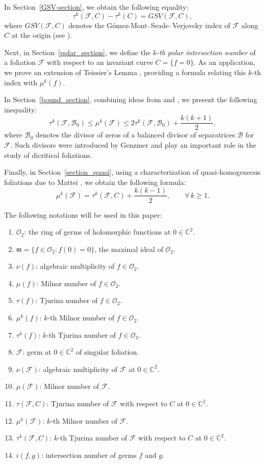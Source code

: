 \documentclass[12pt,letterpaper]{amsart}
\newcommand{\C}{\mathbb{C}}
\newcommand{\F}{\mathcal{F}}
\newcommand{\m}{\mathfrak{m}}
\newcommand{\B}{\mathcal{B}}
\begin{document}
\par In Section~\ref{GSV-section}, we obtain the following equality:
\[
\tau^k(\F,C) - \tau^k(C) = GSV(\F,C),
\]
where $GSV(\F,C)$ denotes the G\'omez-Mont–Seade–Verjovsky index of $\F$ along $C$ at the origin (see \cite{GSV}).  

Next, in Section~\ref{polar_section}, we define the \textit{$k$-th polar intersection number} of a foliation $\F$ with respect to an invariant curve $C = \{f = 0\}$. As an application, we prove an extension of Teissier’s Lemma \cite{Teissier}, providing a formula relating this $k$-th index with $\mu^{k}(f)$.  

\par In Section~\ref{bound_section}, combining ideas from \cite{Liu} and \cite{Hussain_1}, we present the following inequality:
\[
\tau^{k}(\F,\B_0) \leq \mu^{k}(\F) \leq 2\tau^{k}(\F,\B_0) + \frac{k(k+1)}{2},
\]
where $\B_0$ denotes the divisor of zeros of a balanced divisor of separatrices $\B$ for $\F$. Such divisors were introduced by Genzmer \cite{Genzmer} and play an important role in the study of dicritical foliations.  

\par Finally, in Section~\ref{section_quasi}, using a characterization of quasi-homogeneous foliations due to Mattei \cite{quasiMattei}, we obtain the following formula:
\[
\mu^{k}(\mathcal{F}) = \tau^{k}(\mathcal{F}, C) + \frac{k(k-1)}{2}, \qquad \forall \, k \geq 1.
\]

\par The following notations will be used in this paper:
\begin{enumerate}
\item $\mathcal{O}_2$: the ring of germs of holomorphic functions at $0\in\C^2$.
\item $\m=\{ f\in\mathcal{O}_2 : f(0)=0\}$, the maximal ideal of $\mathcal{O}_2$.
\item $\nu(f)$: algebraic multiplicity of $f\in\mathcal{O}_2$.
\item $\mu(f)$: Milnor number of $f\in\mathcal{O}_2$.
\item $\tau(f)$: Tjurina number of $f\in\mathcal{O}_2$.
\item $\mu^k(f)$: $k$-th Milnor number of $f\in\mathcal{O}_2$.
\item $\tau^k(f)$: $k$-th Tjurina number of $f\in\mathcal{O}_2$.
\item $\F$: germ at $0\in\C^2$ of singular foliation.
\item $\nu(\F)$: algebraic multiplicity of $\F$ at $0\in\C^2$.
\item $\mu(\F)$: Milnor number of $\F$.
\item $\tau(\F,C)$: Tjurina number of $\F$ with respect to $C$ at $0\in\C^2$.
\item $\mu^{k}(\F)$: $k$-th Milnor number of $\F$.
\item $\tau^{k}(\F,C)$: $k$-th Tjurina number of $\F$ with respect to $C$ at $0\in\C^2$.
\item $i(f,g)$: intersection number of germs $f$ and $g$. 
\end{enumerate}
\end{document}
